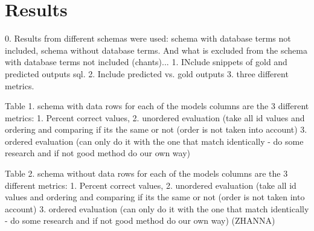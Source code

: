 \section{Results}




0. Results from different schemas were used: schema with database terms not included, schema without database terms. And what is excluded from the schema with database terms not included (chants)...
1. INclude snippets of gold and predicted outputs sql.
2. Include predicted vs. gold outputs
3. three different metrics.

Table 1. schema with data
rows for each of the models
columns are the 3 different metrics: 1. Percent correct values, 2. unordered evaluation (take all id values and ordering and comparing if its the same or not (order is not taken into account) 3. ordered evaluation (can only do it with the one that match identically - do some research and if not good method do our own way)

Table 2. schema without data
rows for each of the models
columns are the 3 different metrics: 1. Percent correct values, 2. unordered evaluation (take all id values and ordering and comparing if its the same or not (order is not taken into account) 3. ordered evaluation (can only do it with the one that match identically - do some research and if not good method do our own way)
(ZHANNA)